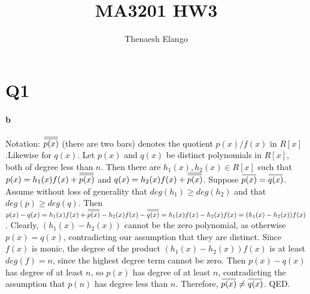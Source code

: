 \documentclass[]{article}
\title{MA3201 HW3}
\author{Thenaesh Elango}
\begin{document}
\newcommand{\overbar}[1]{\mkern 1.5mu\overline{\mkern-1.5mu#1\mkern-1.5mu}\mkern 1.5mu}
\newcommand{\series}{\ensuremath{\sum_{n = 0}^{\infty}}}
\newcommand{\finitesum}{\ensuremath{\sum_{n = 0}^{m}}}
\maketitle

\section*{Q1}
	\paragraph{b}
	Notation: $\overbar{\overbar{p(x)}}$ (there are two bars) denotes the quotient $p(x)/f(x)$ in $R[x]$.\newline Likewise for $q(x)$.\newline\newline
	Let $p(x)$ and $q(x)$ be distinct polynomials in $R[x]$, both of degree less than $n$.\newline
	Then there are $h_1(x), h_2(x) \in R[x]$ such that $p(x) = h_1(x)f(x) + \overbar{\overbar{p(x)}}$ and $q(x) = h_2(x)f(x) + \overbar{\overbar{p(x)}}$.\newline\newline
	Suppose $\overbar{p(x)} = \overbar{q(x)}$.\newline
	Assume without loss of generality that $deg(h_1) \ge deg(h_2)$ and that $deg(p) \ge deg(q)$.\newline
	Then $p(x) - q(x) = h_1(x)f(x) + \overbar{\overbar{p(x)}} - h_2(x)f(x) - \overbar{\overbar{q(x)}} = h_1(x)f(x) - h_2(x)f(x) = (h_1(x) - h_2(x))f(x)$.\newline
	Clearly, $(h_1(x) - h_2(x))$ cannot be the zero polynomial, as otherwise $p(x) = q(x)$, contradicting our assumption that they are distinct.\newline
	Since $f(x)$ is monic, the degree of the product $(h_1(x) - h_2(x))f(x)$ is at least $deg(f) = n$, since the highest degree term cannot be zero.\newline
	Then $p(x) - q(x)$ has degree of at least $n$, so $p(x)$ has degree of at least $n$, contradicting the assumption that $p(n)$ has degree less than $n$.\newline
	Therefore, $\overbar{p(x)} \not= \overbar{q(x)}$. QED.
	
\end{document}
